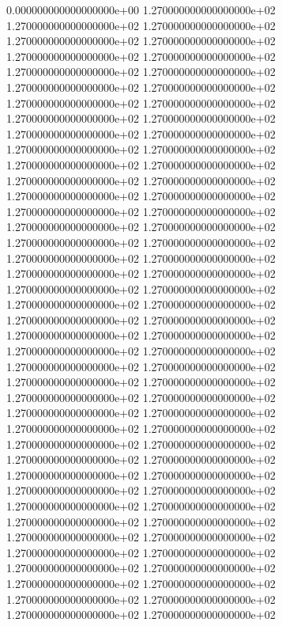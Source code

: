0.000000000000000000e+00 1.270000000000000000e+02 1.270000000000000000e+02 1.270000000000000000e+02 1.270000000000000000e+02 1.270000000000000000e+02 1.270000000000000000e+02 1.270000000000000000e+02 1.270000000000000000e+02 1.270000000000000000e+02 1.270000000000000000e+02 1.270000000000000000e+02 1.270000000000000000e+02 1.270000000000000000e+02 1.270000000000000000e+02 1.270000000000000000e+02 1.270000000000000000e+02 1.270000000000000000e+02 1.270000000000000000e+02 1.270000000000000000e+02 1.270000000000000000e+02 1.270000000000000000e+02 1.270000000000000000e+02 1.270000000000000000e+02 1.270000000000000000e+02 1.270000000000000000e+02 1.270000000000000000e+02 1.270000000000000000e+02 1.270000000000000000e+02 1.270000000000000000e+02 1.270000000000000000e+02 1.270000000000000000e+02 1.270000000000000000e+02 1.270000000000000000e+02 1.270000000000000000e+02 1.270000000000000000e+02 1.270000000000000000e+02 1.270000000000000000e+02 1.270000000000000000e+02 1.270000000000000000e+02 1.270000000000000000e+02 1.270000000000000000e+02 1.270000000000000000e+02 1.270000000000000000e+02 1.270000000000000000e+02 1.270000000000000000e+02 1.270000000000000000e+02 1.270000000000000000e+02 1.270000000000000000e+02 1.270000000000000000e+02 1.270000000000000000e+02 1.270000000000000000e+02 1.270000000000000000e+02 1.270000000000000000e+02 1.270000000000000000e+02 1.270000000000000000e+02 1.270000000000000000e+02 1.270000000000000000e+02 1.270000000000000000e+02 1.270000000000000000e+02 1.270000000000000000e+02 1.270000000000000000e+02 1.270000000000000000e+02 1.270000000000000000e+02 1.270000000000000000e+02 1.270000000000000000e+02 1.270000000000000000e+02 1.270000000000000000e+02 1.270000000000000000e+02 1.270000000000000000e+02 1.270000000000000000e+02 1.270000000000000000e+02 1.270000000000000000e+02 1.270000000000000000e+02 1.270000000000000000e+02 1.270000000000000000e+02 1.270000000000000000e+02 1.270000000000000000e+02 1.270000000000000000e+02 1.270000000000000000e+02
